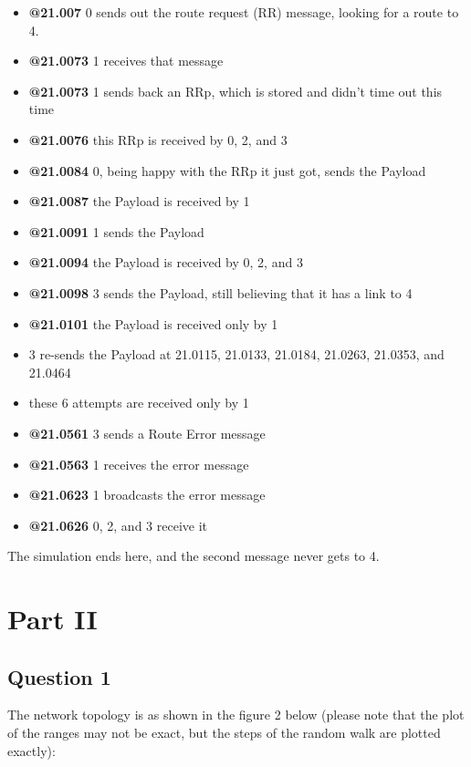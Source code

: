 \documentclass[11pt,journal]{article}
\begin{document}
	\begin{itemize}
		\item \textbf{@21.007} 0 sends out the route request (RR) message, looking for a route to 4.
		\item \textbf{@21.0073} 1 receives that message
		\item \textbf{@21.0073} 1 sends back an RRp, which is stored and didn't time out this time
		\item \textbf{@21.0076} this RRp is received by 0, 2, and 3
		\item \textbf{@21.0084} 0, being happy with the RRp it just got, sends the Payload
		\item \textbf{@21.0087} the Payload is received by 1
		\item \textbf{@21.0091} 1 sends the Payload
		\item \textbf{@21.0094} the Payload is received by 0, 2, and 3
		\item \textbf{@21.0098} 3 sends the Payload, still believing that it has a link to 4
		\item \textbf{@21.0101} the Payload is received only by 1
		\item 3 re-sends the Payload at 21.0115, 21.0133, 21.0184, 21.0263, 21.0353, and 21.0464
		\item these 6 attempts are received only by 1
		\item \textbf{@21.0561} 3 sends a Route Error message
		\item \textbf{@21.0563} 1 receives the error message
		\item \textbf{@21.0623} 1 broadcasts the error message
		\item \textbf{@21.0626} 0, 2, and 3 receive it
		
	\end{itemize}

	The simulation ends here, and the second message never gets to 4.
	\pagebreak
	\section{Part II}
	\subsection{Question 1}
	The network topology is as shown in the figure 2 below (please note that the plot of the ranges may not be exact, but the steps of the random walk are plotted exactly):
	
\end{document}
